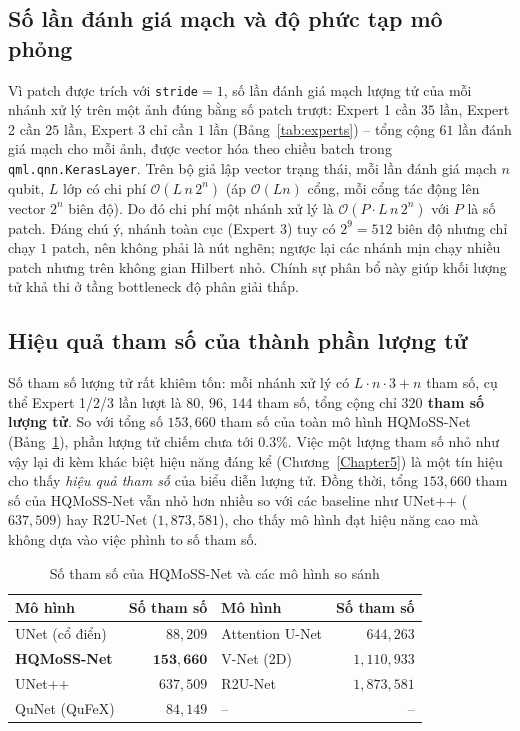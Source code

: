 \subsection{Số lần đánh giá mạch và độ phức tạp mô phỏng}
Vì patch được trích với \texttt{stride}$=1$, số lần đánh giá mạch lượng tử của mỗi nhánh xử lý trên một ảnh đúng bằng số patch trượt: Expert 1 cần $35$ lần, Expert 2 cần $25$ lần, Expert 3 chỉ cần $1$ lần (Bảng~\ref{tab:experts}) -- tổng cộng $61$ lần đánh giá mạch cho mỗi ảnh, được vector hóa theo chiều batch trong \texttt{qml.qnn.KerasLayer}. Trên bộ giả lập vector trạng thái, mỗi lần đánh giá mạch $n$ qubit, $L$ lớp có chi phí $\mathcal{O}(L\,n\,2^{n})$ (áp $\mathcal{O}(Ln)$ cổng, mỗi cổng tác động lên vector $2^n$ biên độ). Do đó chi phí một nhánh xử lý là $\mathcal{O}(P\cdot L\,n\,2^{n})$ với $P$ là số patch. Đáng chú ý, nhánh toàn cục (Expert 3) tuy có $2^9=512$ biên độ nhưng chỉ chạy $1$ patch, nên không phải là nút nghẽn; ngược lại các nhánh mịn chạy nhiều patch nhưng trên không gian Hilbert nhỏ. Chính sự phân bổ này giúp khối lượng tử khả thi ở tầng bottleneck độ phân giải thấp.

\subsection{Hiệu quả tham số của thành phần lượng tử}
Số tham số lượng tử rất khiêm tốn: mỗi nhánh xử lý có $L\!\cdot\!n\!\cdot\!3 + n$ tham số, cụ thể Expert 1/2/3 lần lượt là $80$, $96$, $144$ tham số, tổng cộng chỉ \textbf{$320$ tham số lượng tử}. So với tổng số $153{,}660$ tham số của toàn mô hình HQMoSS-Net (Bảng~\ref{tab:params}), phần lượng tử chiếm chưa tới $0.3\%$. Việc một lượng tham số nhỏ như vậy lại đi kèm khác biệt hiệu năng đáng kể (Chương~\ref{Chapter5}) là một tín hiệu cho thấy \emph{hiệu quả tham số} của biểu diễn lượng tử. Đồng thời, tổng $153{,}660$ tham số của HQMoSS-Net vẫn nhỏ hơn nhiều so với các baseline như UNet++ ($637{,}509$) hay R2U-Net ($1{,}873{,}581$), cho thấy mô hình đạt hiệu năng cao mà không dựa vào việc phình to số tham số.

\begin{table}[h]
\centering
\caption{Số tham số của HQMoSS-Net và các mô hình so sánh}
\label{tab:params}
\begin{tabular}{|l|r|l|r|}
\hline
\textbf{Mô hình} & \textbf{Số tham số} & \textbf{Mô hình} & \textbf{Số tham số} \\ \hline
UNet (cổ điển) & $88{,}209$ & Attention U-Net & $644{,}263$ \\ \hline
\textbf{HQMoSS-Net} & $\mathbf{153{,}660}$ & V-Net (2D) & $1{,}110{,}933$ \\ \hline
UNet++ & $637{,}509$ & R2U-Net & $1{,}873{,}581$ \\ \hline
QuNet (QuFeX) & $84{,}149$ & -- & -- \\ \hline
\end{tabular}
\end{table}
\FloatBarrier

